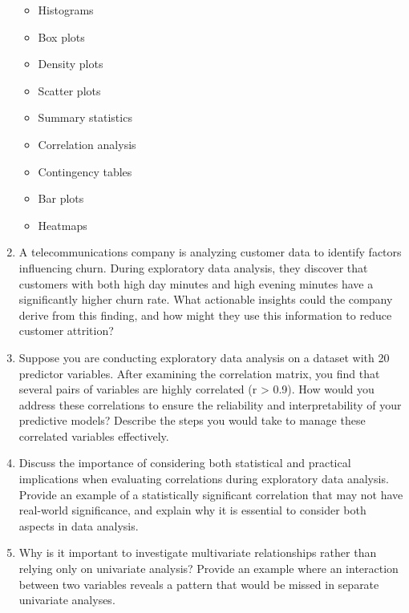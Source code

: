\documentclass[
  11pt,
]{book}
\providecommand{\tightlist}{%
  \setlength{\itemsep}{0pt}\setlength{\parskip}{0pt}}
\theoremstyle{definition}
\theoremstyle{definition}
\theoremstyle{definition}
\theoremstyle{definition}
\theoremstyle{remark}
\begin{document}
\begin{enumerate}
  \begin{itemize}
  \tightlist
  \item
    Histograms\\
  \item
    Box plots\\
  \item
    Density plots\\
  \item
    Scatter plots\\
  \item
    Summary statistics\\
  \item
    Correlation analysis\\
  \item
    Contingency tables\\
  \item
    Bar plots\\
  \item
    Heatmaps
  \end{itemize}
\item
  A telecommunications company is analyzing customer data to identify factors influencing churn. During exploratory data analysis, they discover that customers with both high day minutes and high evening minutes have a significantly higher churn rate. What actionable insights could the company derive from this finding, and how might they use this information to reduce customer attrition?
\item
  Suppose you are conducting exploratory data analysis on a dataset with 20 predictor variables. After examining the correlation matrix, you find that several pairs of variables are highly correlated (r \textgreater{} 0.9). How would you address these correlations to ensure the reliability and interpretability of your predictive models? Describe the steps you would take to manage these correlated variables effectively.
\item
  Discuss the importance of considering both statistical and practical implications when evaluating correlations during exploratory data analysis. Provide an example of a statistically significant correlation that may not have real-world significance, and explain why it is essential to consider both aspects in data analysis.
\item
  Why is it important to investigate multivariate relationships rather than relying only on univariate analysis? Provide an example where an interaction between two variables reveals a pattern that would be missed in separate univariate analyses.

\end{enumerate}
\end{document}
